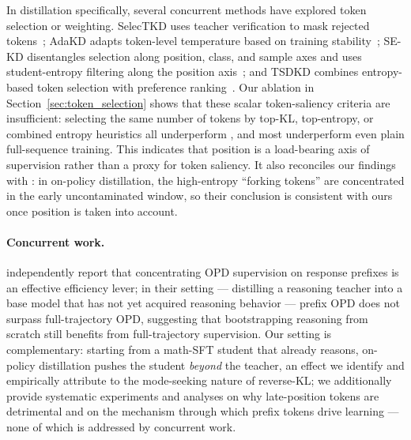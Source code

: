 In distillation specifically, several concurrent methods have explored token selection or weighting.
SelecTKD uses teacher verification to mask rejected tokens~\citep{huang2025selectkd}; AdaKD adapts token-level temperature based on training stability~\citep{xie2026adakd}; SE-KD disentangles selection along position, class, and sample axes and uses student-entropy filtering along the position axis~\citep{tavor2026rethinking}; and TSDKD combines entropy-based token selection with preference ranking~\citep{kim2026tsdkd}.
Our ablation in Section~\ref{sec:token_selection} shows that these scalar token-saliency criteria are insufficient: selecting the same number of tokens by top-KL, top-entropy, or combined entropy heuristics all underperform \method{}, and most underperform even plain full-sequence training.
This indicates that position is a load-bearing axis of supervision rather than a proxy for token saliency.
It also reconciles our findings with \citet{wang2025beyond8020}: in on-policy distillation, the high-entropy ``forking tokens'' are concentrated in the early uncontaminated window, so their conclusion is consistent with ours once position is taken into account.

\paragraph{Concurrent work.}
\citet{zhang2026prefix} independently report that concentrating OPD supervision on response prefixes is an effective efficiency lever; in their setting --- distilling a reasoning teacher into a base model that has not yet acquired reasoning behavior --- prefix OPD does not surpass full-trajectory OPD, suggesting that bootstrapping reasoning from scratch still benefits from full-trajectory supervision.
Our setting is complementary: starting from a math-SFT student that already reasons, on-policy distillation pushes the student \emph{beyond} the teacher, an effect we identify and empirically attribute to the mode-seeking nature of reverse-KL; we additionally provide systematic experiments and analyses on why late-position tokens are detrimental and on the mechanism through which prefix tokens drive learning --- none of which is addressed by concurrent work.
